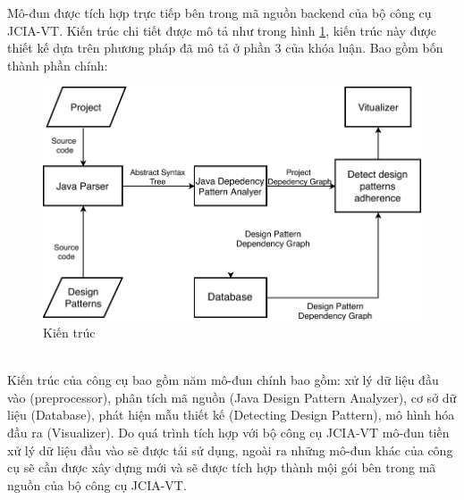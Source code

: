 \documentclass[12pt]{report}
\begin{document}
\noindent Mô-đun được tích hợp trực tiếp bên trong mã nguồn backend của bộ công cụ JCIA-VT. Kiến trúc chi tiết được mô tả như trong hình \ref{fig:detect_design_pattern_architexture}, kiến trúc này được thiết kế dựa trên phương pháp đã mô tả ở phần 3 của khóa luận. Bao gồm bốn thành phần chính:
\begin{figure}[!htbp]
	\centering
	\includegraphics[scale=0.3]{images/c4_architexture}
	\caption{Kiến trúc }
	\label{fig:detect_design_pattern_architexture}
\end{figure}\\
Kiến trúc của công cụ bao gồm năm mô-đun chính bao gồm: xử lý dữ liệu đầu vào (preprocessor), phân tích mã nguồn (Java Design Pattern Analyzer), cơ sở dữ liệu (Database), phát hiện mẫu thiết kế (Detecting Design Pattern), mô hình hóa đầu ra (Visualizer). Do quá trình tích hợp với bộ công cụ JCIA-VT mô-đun tiền xử lý dữ liệu đầu vào sẽ được tái sử dụng, ngoài ra những mô-đun khác của công cụ sẽ cần được xây dựng mới và sẽ được tích hợp thành mội gói bên trong mã nguồn của bộ công cụ  JCIA-VT.
\end{document}
